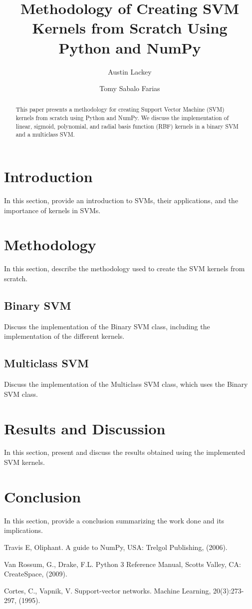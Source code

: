 \documentclass[12pt]{article}
\title{Methodology of Creating SVM Kernels from Scratch Using Python and NumPy}
\author{Austin Lackey}
\author{Tomy Sabalo Farias}
\affil{DSCI 320, Colorado State University}
\begin{document}
\maketitle

\begin{abstract}
This paper presents a methodology for creating Support Vector Machine (SVM) kernels from scratch using Python and NumPy. We discuss the implementation of linear, sigmoid, polynomial, and radial basis function (RBF) kernels in a binary SVM and a multiclass SVM.
\end{abstract}

\section{Introduction}
In this section, provide an introduction to SVMs, their applications, and the importance of kernels in SVMs.

\section{Methodology}
In this section, describe the methodology used to create the SVM kernels from scratch.

\subsection{Binary SVM}
Discuss the implementation of the Binary SVM class, including the implementation of the different kernels.

\subsection{Multiclass SVM}
Discuss the implementation of the Multiclass SVM class, which uses the Binary SVM class.

\section{Results and Discussion}
In this section, present and discuss the results obtained using the implemented SVM kernels.

\section{Conclusion}
In this section, provide a conclusion summarizing the work done and its implications.

\begin{thebibliography}{9}
Travis E, Oliphant. 
A guide to NumPy, USA: Trelgol Publishing, (2006).

Van Rossum, G., Drake, F.L. 
Python 3 Reference Manual, Scotts Valley, CA: CreateSpace, (2009).

Cortes, C., Vapnik, V. 
Support-vector networks. Machine Learning, 20(3):273-297, (1995).
\end{thebibliography}
\end{document}
